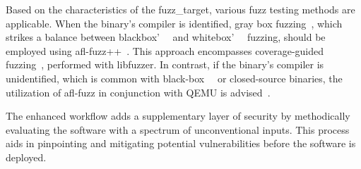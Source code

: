 Based on the characteristics of the \gls{fuzz_target}, various fuzz testing
methods are applicable. When the binary's compiler is identified, gray box
fuzzing~\cite{jamil2016software}, which strikes a balance between
blackbox'~\cite{godefroid2007random}~\cite{jamil2016software} and
whitebox'~\cite{godefroid2007random}~\cite{jamil2016software} fuzzing, should be
employed using afl-fuzz++~\cite{257204}. This approach encompasses
coverage-guided fuzzing~\cite{abran2001guide}, performed with
libfuzzer\cite{libFuzze17:online}. In contrast, if the binary's compiler is
unidentified, which is common with
black-box~\cite{jamil2016software}~\cite{pudas2017improving} or closed-source
binaries, the utilization of afl-fuzz in conjunction with QEMU is
advised~\cite{AFLplusp57:online}.

The enhanced workflow adds a supplementary layer of security
by methodically evaluating the software with a spectrum of unconventional
inputs. This process aids in pinpointing and mitigating potential
vulnerabilities before the software is deployed.


